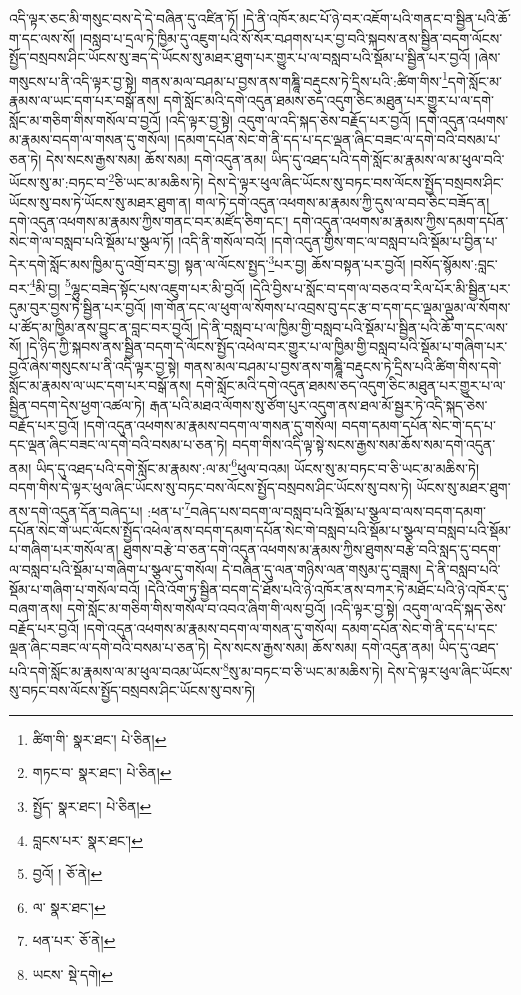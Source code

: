 འདི་ལྟར་ཅང་མི་གསུང་བས་དེ་དེ་བཞིན་དུ་འཛིན་ཏོ། །དེ་ནི་འཁོར་མང་པོ་ཉེ་བར་འཇོག་པའི་གནང་བ་སྦྱིན་པའི་ཆོ་ག་དང་ལས་སོ། །བསླབ་པ་དྲལ་ཏེ་ཁྱིམ་དུ་འཇུག་པའི་སོ་སོར་བཤགས་པར་བྱ་བའི་སྐབས་ནས་སྦྱིན་བདག་ལོངས་སྤྱོད་བསྲབས་ཤིང་ཡོངས་སུ་ཟད་དེ་ཡོངས་སུ་མཐར་ཐུག་པར་གྱུར་པ་ལ་བསླབ་པའི་སྡོམ་པ་སྦྱིན་པར་བྱའོ། །ཞེས་གསུངས་པ་ནི་འདི་ལྟར་བྱ་སྟེ། གནས་མལ་བཤམ་པ་བྱས་ནས་གཎྜཱི་བརྡུངས་ཏེ་དྲིས་པའི་:ཚིག་གིས་\footnote{ཚིག་གི་  སྣར་ཐང་།  པེ་ཅིན། }དགེ་སློང་མ་རྣམས་ལ་ཡང་དག་པར་བསྒོ་ནས། དགེ་སློང་མའི་དགེ་འདུན་ཐམས་ཅད་འདུག་ཅིང་མཐུན་པར་གྱུར་པ་ལ་དགེ་སློང་མ་གཅིག་གིས་གསོལ་བ་བྱའོ། །འདི་ལྟར་བྱ་སྟེ། འདུག་ལ་འདི་སྐད་ཅེས་བརྗོད་པར་བྱའོ། །དགེ་འདུན་འཕགས་མ་རྣམས་བདག་ལ་གསན་དུ་གསོལ། །དམག་དཔོན་སེང་གེ་ནི་དད་པ་དང་ལྡན་ཞིང་བཟང་ལ་དགེ་བའི་བསམ་པ་ཅན་ཏེ། དེས་སངས་རྒྱས་སམ། ཆོས་སམ། དགེ་འདུན་ནམ། ཡིད་དུ་འཐད་པའི་དགེ་སློང་མ་རྣམས་ལ་མ་ཕུལ་བའི་ཡོངས་སུ་མ་:བཏང་བ་\footnote{གཏང་བ་  སྣར་ཐང་།  པེ་ཅིན། }ཅི་ཡང་མ་མཆིས་ཏེ། དེས་དེ་ལྟར་ཕུལ་ཞིང་ཡོངས་སུ་བཏང་བས་ལོངས་སྤྱོད་བསྲབས་ཤིང་ཡོངས་སུ་བས་ཏེ་ཡོངས་སུ་མཐར་ཐུག་ན། གལ་ཏེ་དགེ་འདུན་འཕགས་མ་རྣམས་ཀྱི་དུས་ལ་བབ་ཅིང་བཟོད་ན། དགེ་འདུན་འཕགས་མ་རྣམས་ཀྱིས་གནང་བར་མཛོད་ཅིག་དང་། དགེ་འདུན་འཕགས་མ་རྣམས་ཀྱིས་དམག་དཔོན་སེང་གེ་ལ་བསླབ་པའི་སྡོམ་པ་སྩལ་ཏོ། །འདི་ནི་གསོལ་བའོ། །དགེ་འདུན་གྱིས་གང་ལ་བསླབ་པའི་སྡོམ་པ་བྱིན་པ་དེར་དགེ་སློང་མས་ཁྱིམ་དུ་འགྲོ་བར་བྱ། སྟན་ལ་ལོངས་སྤྱད་\footnote{སྤྱོད་  སྣར་ཐང་།  པེ་ཅིན། }པར་བྱ། ཆོས་བསྟན་པར་བྱའོ། །བསོད་སྙོམས་:བླང་བར་\footnote{བླངས་པར་  སྣར་ཐང་། }མི་བྱ། \footnote{བྱའོ། །   ཅོ་ནེ། }ལྷུང་བཟེད་སྟོང་པས་འཇུག་པར་མི་བྱའོ། །དེའི་བྱིས་པ་སློང་བ་དག་ལ་བཅའ་བ་རིལ་པོར་མི་སྦྱིན་པར་དུམ་བུར་བྱས་ཏེ་སྦྱིན་པར་བྱའོ། །ག་གོན་དང་ལ་ཕུག་ལ་སོགས་པ་འབྲས་བུ་དང་རྩ་བ་དག་དང་ལྡམ་ལྡུམ་ལ་སོགས་པ་ཚོད་མ་ཁྱིམ་ནས་བྱུང་ན་བླང་བར་བྱའོ། །དེ་ནི་བསླབ་པ་ལ་ཁྱིམ་གྱི་བསླབ་པའི་སྡོམ་པ་སྦྱིན་པའི་ཆོ་ག་དང་ལས་སོ། །དེ་ཉིད་ཀྱི་སྐབས་ནས་སྦྱིན་བདག་དེ་ལོངས་སྤྱོད་འཕེལ་བར་གྱུར་པ་ལ་ཁྱིམ་གྱི་བསླབ་པའི་སྡོམ་པ་གཞིག་པར་བྱའོ་ཞེས་གསུངས་པ་ནི་འདི་ལྟར་བྱ་སྟེ། གནས་མལ་བཤམ་པ་བྱས་ནས་གཎྜཱི་བརྡུངས་ཏེ་དྲིས་པའི་ཚིག་གིས་དགེ་སློང་མ་རྣམས་ལ་ཡང་དག་པར་བསྒོ་ནས། དགེ་སློང་མའི་དགེ་འདུན་ཐམས་ཅད་འདུག་ཅིང་མཐུན་པར་གྱུར་པ་ལ་སྦྱིན་བདག་དེས་ཕྱག་འཚལ་ཏེ། རྒན་པའི་མཐའ་ལོགས་སུ་ཙོག་པུར་འདུག་ནས་ཐལ་མོ་སྦྱར་ཏེ་འདི་སྐད་ཅེས་བརྗོད་པར་བྱའོ། །དགེ་འདུན་འཕགས་མ་རྣམས་བདག་ལ་གསན་དུ་གསོལ། བདག་དམག་དཔོན་སེང་གེ་དད་པ་དང་ལྡན་ཞིང་བཟང་ལ་དགེ་བའི་བསམ་པ་ཅན་ཏེ། བདག་གིས་འདི་ལྟ་སྟེ་སངས་རྒྱས་སམ་ཆོས་སམ་དགེ་འདུན་ནམ། ཡིད་དུ་འཐད་པའི་དགེ་སློང་མ་རྣམས་:ལ་མ་\footnote{ལ་  སྣར་ཐང་། }ཕུལ་བའམ། ཡོངས་སུ་མ་བཏང་བ་ཅི་ཡང་མ་མཆིས་ཏེ། བདག་གིས་དེ་ལྟར་ཕུལ་ཞིང་ཡོངས་སུ་བཏང་བས་ལོངས་སྤྱོད་བསྲབས་ཤིང་ཡོངས་སུ་བས་ཏེ། ཡོངས་སུ་མཐར་ཐུག་ནས་དགེ་འདུན་དོན་བཞེད་པ། :ཕན་པ་\footnote{ཕན་པར་  ཅོ་ནེ། }བཞེད་པས་བདག་ལ་བསླབ་པའི་སྡོམ་པ་སྩལ་བ་ལས་བདག་དམག་དཔོན་སེང་གེ་ཡང་ལོངས་སྤྱོད་འཕེལ་ནས་བདག་དམག་དཔོན་སེང་གེ་བསླབ་པའི་སྡོམ་པ་སྩལ་བ་བསླབ་པའི་སྡོམ་པ་གཞིག་པར་གསོལ་ན། ཐུགས་བརྩེ་བ་ཅན་དགེ་འདུན་འཕགས་མ་རྣམས་ཀྱིས་ཐུགས་བརྩེ་བའི་སླད་དུ་བདག་ལ་བསླབ་པའི་སྡོམ་པ་གཞིག་པ་སྩལ་དུ་གསོལ། དེ་བཞིན་དུ་ལན་གཉིས་ལན་གསུམ་དུ་བཟླས། དེ་ནི་བསླབ་པའི་སྡོམ་པ་གཞིག་པ་གསོལ་བའོ། །དེའི་འོག་ཏུ་སྦྱིན་བདག་དེ་ཐོས་པའི་ཉེ་འཁོར་ནས་བཀར་ཏེ་མཐོང་པའི་ཉེ་འཁོར་དུ་བཞག་ནས། དགེ་སློང་མ་གཅིག་གིས་གསོལ་བ་འབའ་ཞིག་གི་ལས་བྱའོ། །འདི་ལྟར་བྱ་སྟེ། འདུག་ལ་འདི་སྐད་ཅེས་བརྗོད་པར་བྱའོ། །དགེ་འདུན་འཕགས་མ་རྣམས་བདག་ལ་གསན་དུ་གསོལ། དམག་དཔོན་སེང་གེ་ནི་དད་པ་དང་ལྡན་ཞིང་བཟང་ལ་དགེ་བའི་བསམ་པ་ཅན་ཏེ། དེས་སངས་རྒྱས་སམ། ཆོས་སམ། དགེ་འདུན་ནམ། ཡིད་དུ་འཐད་པའི་དགེ་སློང་མ་རྣམས་ལ་མ་ཕུལ་བའམ་ཡོངས་\footnote{ཡངས་  སྡེ་དགེ། }སུ་མ་བཏང་བ་ཅི་ཡང་མ་མཆིས་ཏེ། དེས་དེ་ལྟར་ཕུལ་ཞིང་ཡོངས་སུ་བཏང་བས་ལོངས་སྤྱོད་བསྲབས་ཤིང་ཡོངས་སུ་བས་ཏེ། 